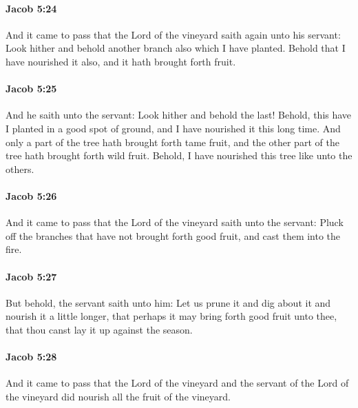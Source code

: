 		\paragraph{Jacob 5:24} %
			\label{JACOB-5-24}

			And it came to pass that the Lord of the vineyard saith again unto his servant:
			Look hither and behold another branch also which I have planted.
			Behold that I have nourished it also,
			and it hath brought forth fruit.

		\paragraph{Jacob 5:25} %
			\label{JACOB-5-25}

			And he saith unto the servant:
			Look hither and behold the last!
			Behold, this have I planted in a good spot of ground,
			and I have nourished it this long time.
			And only a part of the tree hath brought forth tame fruit,
			and the other part of the tree hath brought forth wild fruit.
			Behold, I have nourished this tree like unto the others.

		\paragraph{Jacob 5:26} %
			\label{JACOB-5-26}

			And it came to pass that the Lord of the vineyard saith unto the servant:
			Pluck off the branches that have not brought forth good fruit,
			and cast them into the fire.

		\paragraph{Jacob 5:27} %
			\label{JACOB-5-27}

			But behold, the servant saith unto him:
			Let us prune it and dig about it and nourish it a little longer,
			that perhaps it may bring forth good fruit unto thee,
			that thou canst lay it up against the season.

		\paragraph{Jacob 5:28} %
			\label{JACOB-5-28}

			And it came to pass that
			the Lord of the vineyard and the servant of the Lord of the vineyard
			did nourish all the fruit of the vineyard.

